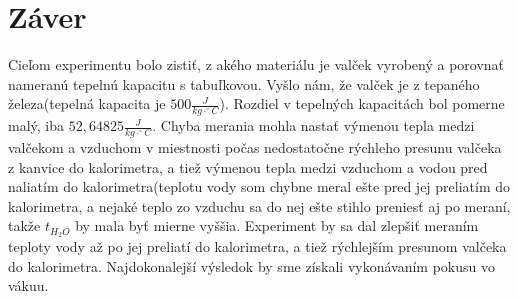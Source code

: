 \documentclass{article}
\begin{document}
\section{Záver}
Cieľom experimentu bolo zistiť, z akého materiálu je valček vyrobený a porovnať nameranú tepelnú kapacitu s tabuľkovou. 
Vyšlo nám, že valček je z tepaného železa(tepelná kapacita je $500\frac{J}{kg\cdot ^{\circ} C}$).
Rozdiel v tepelných kapacitách bol pomerne malý, iba $52,64825 \frac{J}{kg\cdot ^{\circ} C}$.
Chyba merania mohla nastať výmenou tepla medzi valčekom a vzduchom v miestnosti počas nedostatočne rýchleho presunu valčeka z kanvice do kalorimetra, a tiež výmenou tepla medzi vzduchom a vodou pred naliatím do kalorimetra(teplotu vody som chybne meral ešte pred jej preliatím do kalorimetra, a nejaké teplo zo vzduchu sa do nej ešte stihlo preniesť aj po meraní, takže $t_{H_2O}$ by mala byť mierne vyššia.
Experiment by sa dal zlepšiť meraním teploty vody až po jej preliatí do kalorimetra, a tiež rýchlejším presunom valčeka do kalorimetra. Najdokonalejší výsledok by sme získali vykonávaním pokusu vo vákuu.
\end{document}

